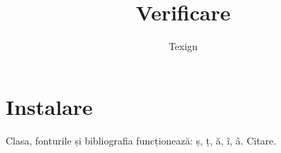 \documentclass{texign-article}
\title{Verificare}
\author{Texign}
\begin{document}
\maketitle
\section{Instalare}
Clasa, fonturile și bibliografia funcționează: ș, ț, ă, î, â.
Citare\cite[13]{schnapp}.
\printsources
\end{document}
